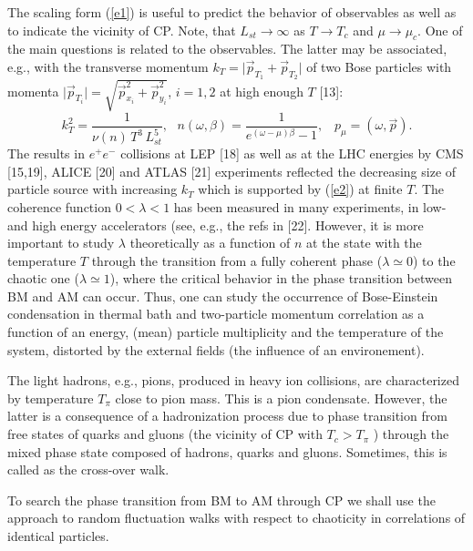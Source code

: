 \documentclass[WPCF,manyauthors]{wpcfTemplate}
\begin{document}
The scaling form (\ref {e1}) is useful to predict the behavior of observables as well as to indicate the vicinity of CP. %
Note, that $ L_{st}\rightarrow\infty$ as $T\rightarrow T_{c}$ and  $\mu\rightarrow \mu_{c}$. One of the main questions is related to the observables. The latter may be associated, e.g.,  with the transverse momentum $k_{T} = \vert \vec p_{T_{1}} + \vec p_{T_{2}}\vert$ of two Bose particles with momenta $\vert \vec p_{T_{i}}\vert = \sqrt { \vec p_{x_{i}}^{2} +  \vec p_{y_{i}}^{2}}$, $i= 1,2$ at high enough $T$ [13]:
 \begin{equation}
\label{e2}
 k_{T}^{2} = \frac{1}{\nu (n)\, T^{3}\,L_{st}^5},\,\, \,\,n(\omega,\beta) = \frac{1}{e^{(\omega - \mu)\beta} -1},\,\,\,\,\, p_{\mu} = (\omega,\vec p).
\end{equation} 
The results in $e^{+}e^{-}$ collisions at LEP [18] as well as at the LHC energies by CMS [15,19], ALICE [20] and ATLAS [21] experiments reflected the decreasing size of particle source with increasing $k_{T}$ which is supported by (\ref{e2}) at finite $T$.
The coherence function $0 <\lambda < 1$ has been measured in many experiments, in low- and high energy accelerators (see, e.g., the refs in [22]. However, it is more important to study $\lambda$ theoretically as a function of $n$ at  the state with  the temperature $T$ through the transition from a fully coherent phase ($\lambda \simeq 0$) to the chaotic one ($\lambda \simeq 1$), where the critical behavior in the phase transition between BM and AM can occur. Thus, one can study the occurrence of Bose-Einstein condensation in thermal bath and two-particle momentum correlation as a function of an energy, (mean) particle multiplicity and the temperature of the system, distorted by the external fields (the influence of an environement). 

The light hadrons, e.g., pions, produced in heavy ion collisions, are characterized by temperature
$T_{\pi}$ close to pion mass. This is a pion condensate. However, the latter is a consequence of a hadronization process due to phase transition from free states of quarks and gluons (the vicinity of CP with $T_{c} > T_{\pi}$ ) through the mixed phase state composed of hadrons, quarks and gluons. Sometimes, this is called as the cross-over walk. 

To search the phase transition from BM to AM through CP we shall use the approach to random fluctuation walks with respect to chaoticity in correlations of identical particles.
\end{document}
